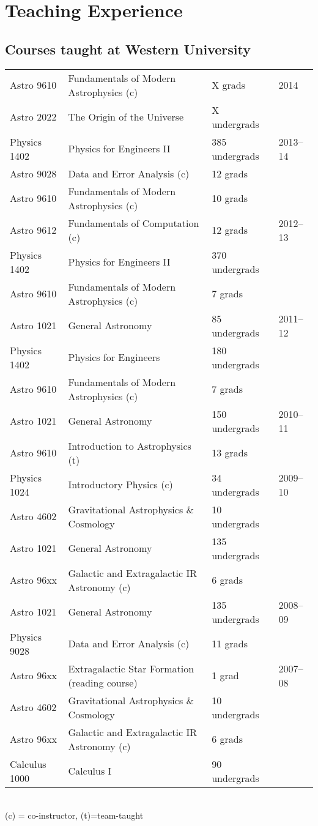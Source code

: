 \documentclass[12pt]{article}
\begin{document}
\section{Teaching Experience}

\subsection{Courses taught at Western University}
\begin{tabular}{lp{9cm}ll}
Astro 9610& Fundamentals of Modern Astrophysics (c) & X grads& 2014\\  
Astro 2022& The Origin of the Universe & X undergrads& \\  
Physics 1402 & Physics for Engineers II &  385 undergrads & 2013--14\\ 
Astro 9028& Data and Error Analysis (c) & 12 grads&\\ 
Astro 9610& Fundamentals of Modern Astrophysics (c) & 10 grads&\\  
Astro 9612& Fundamentals of Computation (c) & 12 grads&2012--13\\
Physics 1402& Physics for Engineers II &  370 undergrads&\\ 
Astro 9610&  Fundamentals of Modern Astrophysics (c) & 7 grads&\\ 
Astro 1021& General Astronomy & 85 undergrads&2011--12\\  
Physics 1402& Physics for Engineers &  180 undergrads&\\ 
Astro 9610& Fundamentals of Modern Astrophysics (c) & 7 grads&\\  
Astro 1021& General Astronomy & 150 undergrads&2010--11\\  
Astro 9610& Introduction to Astrophysics (t) & 13 grads&\\  
Physics 1024& Introductory Physics (c)  & 34 undergrads&2009--10\\ 
Astro 4602& Gravitational Astrophysics \& Cosmology & 10 undergrads&\\  
Astro 1021& General Astronomy & 135 undergrads&\\  
Astro 96xx& Galactic and Extragalactic IR Astronomy (c) & 6 grads&\\
Astro 1021& General Astronomy & 135 undergrads& 2008--09\\ 
Physics 9028& Data and Error Analysis (c) &  11 grads&\\ 
Astro 96xx& Extragalactic Star Formation (reading course) & 1 grad& 2007--08\\ %
Astro 4602& Gravitational Astrophysics \& Cosmology & 10  undergrads&\\ 
Astro 96xx& Galactic and Extragalactic IR Astronomy (c) & 6 grads&\\
Calculus 1000& Calculus I & 90 undergrads&\\
\end{tabular}\\
(c) = co-instructor, (t)=team-taught
\end{document}
